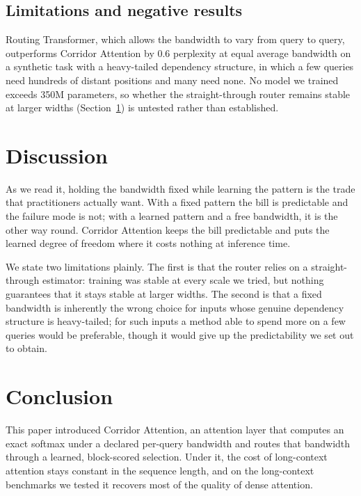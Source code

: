 \documentclass[11pt]{article}
\begin{document}
\subsection{Limitations and negative results}\label{sec:limits}

Routing Transformer, which allows the bandwidth to vary from query to query,
outperforms Corridor Attention by 0.6 perplexity at equal average bandwidth
on a synthetic task with a heavy-tailed dependency structure, in which a few
queries need hundreds of distant positions and many need none. No model we
trained exceeds 350M parameters, so whether the straight-through router
remains stable at larger widths (Section~\ref{sec:discussion}) is untested
rather than established.

\section{Discussion}\label{sec:discussion}

As we read it, holding the bandwidth fixed while learning the pattern is the
trade that practitioners actually want. With a fixed pattern the bill is
predictable and the failure mode is not; with a learned pattern and a free
bandwidth, it is the other way round. Corridor Attention keeps the bill
predictable and puts the learned degree of freedom where it costs nothing at
inference time.

We state two limitations plainly. The first is that the router relies on a
straight-through estimator: training was stable at every scale we tried, but
nothing guarantees that it stays stable at larger widths. The second is that
a fixed bandwidth is inherently the wrong choice for inputs whose genuine
dependency structure is heavy-tailed; for such inputs a method able to spend
more on a few queries would be preferable, though it would give up the
predictability we set out to obtain.

\section{Conclusion}\label{sec:conclusion}

This paper introduced Corridor Attention, an attention layer that computes an
exact softmax under a declared per-query bandwidth and routes that bandwidth
through a learned, block-scored selection. Under it, the cost of long-context
attention stays constant in the sequence length, and on the long-context
benchmarks we tested it recovers most of the quality of dense attention.



\end{document}
